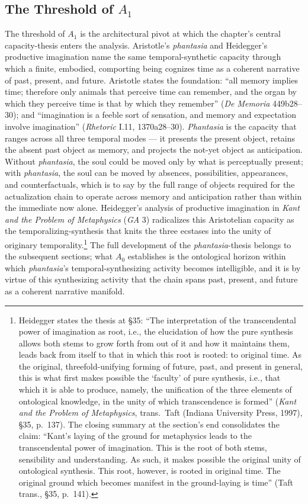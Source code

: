 \subsection{The Threshold of $A_1$}

The threshold of $A_1$ is the architectural pivot at which the chapter's central capacity-thesis enters the analysis. Aristotle's \textit{phantasia} and Heidegger's productive imagination name the same temporal-synthetic capacity through which a finite, embodied, comporting being cognizes time as a coherent narrative of past, present, and future. Aristotle states the foundation: ``all memory implies time; therefore only animals that perceive time can remember, and the organ by which they perceive time is that by which they remember'' (\textit{De Memoria} 449b28--30); and ``imagination is a feeble sort of sensation, and memory and expectation involve imagination'' (\textit{Rhetoric} I.11, 1370a28--30). \textit{Phantasia} is the capacity that ranges across all three temporal modes --- it presents the present object, retains the absent past object as memory, and projects the not-yet object as anticipation. Without \textit{phantasia}, the soul could be moved only by what is perceptually present; with \textit{phantasia}, the soul can be moved by absences, possibilities, appearances, and counterfactuals, which is to say by the full range of objects required for the actualization chain to operate across memory and anticipation rather than within the immediate now alone. Heidegger's analysis of productive imagination in \textit{Kant and the Problem of Metaphysics} (\textit{GA} 3) radicalizes this Aristotelian capacity as the temporalizing-synthesis that knits the three ecstases into the unity of originary temporality.\footnote{Heidegger states the thesis at \S 35: ``The interpretation of the transcendental power of imagination as root, i.e., the elucidation of how the pure synthesis allows both stems to grow forth from out of it and how it maintains them, leads back from itself to that in which this root is rooted: to original time. As the original, threefold-unifying forming of future, past, and present in general, this is what first makes possible the `faculty' of pure synthesis, i.e., that which it is able to produce, namely, the unification of the three elements of ontological knowledge, in the unity of which transcendence is formed'' (\textit{Kant and the Problem of Metaphysics}, trans.~Taft (Indiana University Press, 1997), \S 35, p.~137). The closing summary at the section's end consolidates the claim: ``Kant's laying of the ground for metaphysics leads to the transcendental power of imagination. This is the root of both stems, sensibility and understanding. As such, it makes possible the original unity of ontological synthesis. This root, however, is rooted in original time. The original ground which becomes manifest in the ground-laying is time'' (Taft trans., \S 35, p.~141).} The full development of the \textit{phantasia}-thesis belongs to the subsequent sections; what $A_0$ establishes is the ontological horizon within which \textit{phantasia}'s temporal-synthesizing activity becomes intelligible, and it is by virtue of this synthesizing activity that the chain spans past, present, and future as a coherent narrative manifold.


